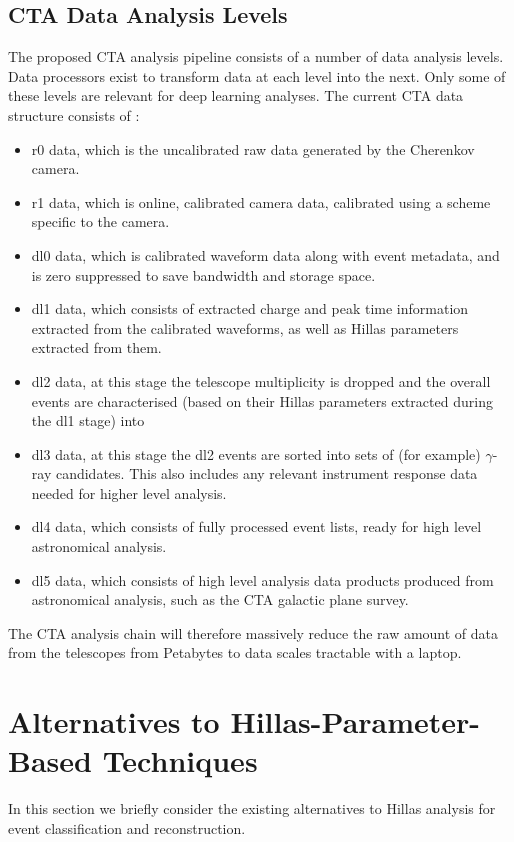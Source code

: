 \subsection{CTA Data Analysis Levels}

The proposed CTA analysis pipeline consists of a number of data analysis levels. Data processors exist to transform data at each level into the next. Only some of these levels are relevant for deep learning analyses. The current CTA data structure consists of \cite{jasonthesis}:
\begin{itemize}
    \item r0 data, which is the uncalibrated raw data generated by the Cherenkov camera.
    \item r1 data, which is online, calibrated camera data, calibrated using a scheme specific to the camera.
    \item dl0 data, which is calibrated waveform data along with event metadata, and is zero suppressed to save bandwidth and storage space.
    \item dl1 data, which consists of extracted charge and peak time information extracted from the calibrated waveforms, as well as Hillas parameters extracted from them.
    \item dl2 data, at this stage the telescope multiplicity is dropped and the overall events are characterised (based on their Hillas parameters extracted during the dl1 stage) into 
    \item dl3 data, at this stage the dl2 events are sorted into sets of (for example) $\gamma$-ray candidates. This also includes any relevant instrument response data needed for higher level analysis.
    \item dl4 data, which consists of fully processed event lists, ready for high level astronomical analysis.
    \item dl5 data, which consists of high level analysis data products produced from astronomical analysis, such as the CTA galactic plane survey.
\end{itemize}

The CTA analysis chain will therefore massively reduce the raw amount of data from the telescopes from Petabytes to data scales tractable with a laptop.


\section{Alternatives to Hillas-Parameter-Based Techniques}
In this section we briefly consider the existing alternatives to Hillas analysis for event classification and reconstruction.
